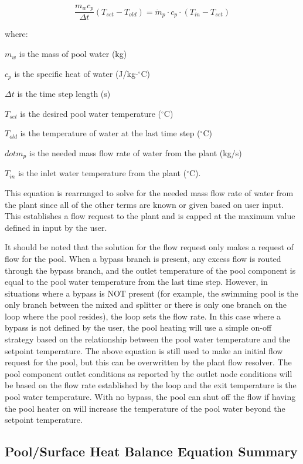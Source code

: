 \begin{equation}
\frac{m_w c_p}{\Delta t} (T_{set}-T_{old}) = \dot{m}_p \cdot c_p \cdot (T_{in} - T_{set} )
\end{equation}

where:

\(m_w\) is the mass of pool water (kg)

\(c_p\) is the specific heat of water (J/kg-\(^{\circ}\)C)

\(\Delta t\) is the time step length (s)

\(T_{set}\) is the desired pool water temperature (\(^{\circ}\)C)

\(T_{old}\) is the temperature of water at the last time step (\(^{\circ}\)C)

\(dot{m}_p\) is the needed mass flow rate of water from the plant (kg/s)

\(T_{in}\) is the inlet water temperature from the plant (\(^{\circ}\)C).


This equation is rearranged to solve for the needed mass flow rate of water from the plant since all of the other terms are known or given based on user input. This establishes a flow request to the plant and is capped at the maximum value defined in input by the user.

It should be noted that the solution for the flow request only makes a request of flow for the pool. When a bypass branch is present, any excess flow is routed through the bypass branch, and the outlet temperature of the pool component is equal to the pool water temperature from the last time step. However, in situations where a bypass is NOT present (for example, the swimming pool is the only branch between the mixed and splitter or there is only one branch on the loop where the pool resides), the loop sets the flow rate.  In this case where a bypass is not defined by the user, the pool heating will use a simple on-off strategy based on the relationship between the pool water temperature and the setpoint temperature.  The above equation is still used to make an initial flow request for the pool, but this can be overwritten by the plant flow resolver. The pool component outlet conditions as reported by the outlet node conditions will be based on the flow rate established by the loop and the exit temperature is the pool water temperature.  With no bypass, the pool can shut off the flow if having the pool heater on will increase the temperature of the pool water beyond the setpoint temperature.

\subsection{Pool/Surface Heat Balance Equation Summary}\label{poolsurface-heat-balance-equation-summary}

